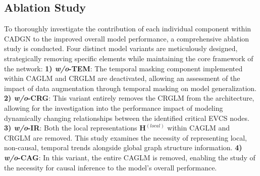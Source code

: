 \documentclass[lettersize,journal]{IEEEtran}
\begin{document}
\vspace{-10pt}
\subsection{Ablation Study}
To thoroughly investigate the contribution of each individual component within CADGN to the improved overall model performance, a comprehensive ablation study is conducted. Four distinct model variants are meticulously designed, strategically removing specific elements while maintaining the core framework of the network:  
\textbf{1) \textit{w/o}-TEM}: The temporal masking component implemented within CAGLM and CRGLM are deactivated, allowing an assessment of the impact of data augmentation through temporal masking on model generalization.
\textbf{2) \textit{w/o}-CRG}: This variant entirely removes the CRGLM from the architecture,  allowing for the investigation into the performance impact of modeling dynamically changing relationships between the identified critical EVCS nodes.
\textbf{3) \textit{w/o}-IR}: Both the local representations $\bm{H}^{(local)}$ within CAGLM and CRGLM are removed. This study examines the necessity of representing local, non-causal, temporal trends alongside global graph structure information.
\textbf{4) \textit{w/o}-CAG}: In this variant, the entire CAGLM is removed, enabling the study of the necessity for causal inference to the model's overall performance.
\end{document}
